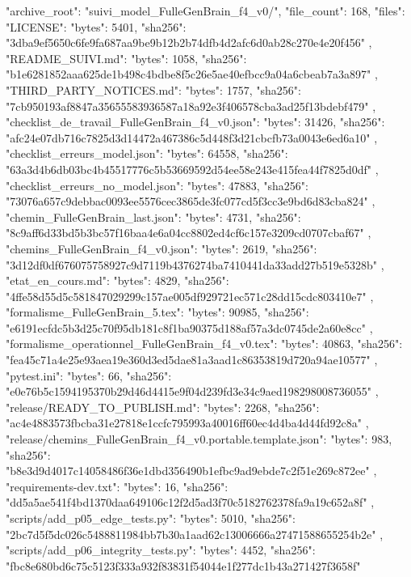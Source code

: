 {
  "archive_root": "suivi_model_FulleGenBrain_f4_v0/",
  "file_count": 168,
  "files": {
    "LICENSE": {
      "bytes": 5401,
      "sha256": "3dba9ef5650c6fe9fa687aa9be9b12b2b74dfb4d2afc6d0ab28c270e4e20f456"
    },
    "README_SUIVI.md": {
      "bytes": 1058,
      "sha256": "b1e6281852aaa625de1b498c4bdbe8f5c26e5ae40efbcc9a04a6cbeab7a3a897"
    },
    "THIRD_PARTY_NOTICES.md": {
      "bytes": 1757,
      "sha256": "7cb950193af8847a35655583936587a18a92e3f406578cba3ad25f13bdebf479"
    },
    "checklist_de_travail_FulleGenBrain_f4_v0.json": {
      "bytes": 31426,
      "sha256": "afc24e07db716c7825d3d14472a467386c5d448f3d21cbcfb73a0043e6ed6a10"
    },
    "checklist_erreurs_model.json": {
      "bytes": 64558,
      "sha256": "63a3d4b6db03bc4b45517776c5b53669592d54ee58e243e415fea44f7825d0df"
    },
    "checklist_erreurs_no_model.json": {
      "bytes": 47883,
      "sha256": "73076a657c9debbac0093ee5576cec3865de3fc077cd5f3cc3e9bd6d83cba824"
    },
    "chemin_FulleGenBrain_last.json": {
      "bytes": 4731,
      "sha256": "8c9aff6d33bd5b3bc57f16baa4e6a04cc8802ed4cf6c157e3209cd0707cbaf67"
    },
    "chemins_FulleGenBrain_f4_v0.json": {
      "bytes": 2619,
      "sha256": "3d12df0df676075758927c9d7119b4376274ba7410441da33add27b519e5328b"
    },
    "etat_en_cours.md": {
      "bytes": 4829,
      "sha256": "4ffe58d55d5c581847029299c157ae005df929721ec571c28dd15cdc803410e7"
    },
    "formalisme_FulleGenBrain_5.tex": {
      "bytes": 90985,
      "sha256": "e6191ecfdc5b3d25c70f95db181c8f1ba90375d188af57a3dc0745de2a60e8cc"
    },
    "formalisme_operationnel_FulleGenBrain_f4_v0.tex": {
      "bytes": 40863,
      "sha256": "fea45c71a4e25e93aea19e360d3ed5dae81a3aad1c86353819d720a94ae10577"
    },
    "pytest.ini": {
      "bytes": 66,
      "sha256": "e0e76b5c1594195370b29d46d4415e9f04d239fd3e34c9aed198298008736055"
    },
    "release/READY_TO_PUBLISH.md": {
      "bytes": 2268,
      "sha256": "ac4e4883573fbcba31e27818e1ccfc795993a40016ff60ec4d4ba4d44fd92c8a"
    },
    "release/chemins_FulleGenBrain_f4_v0.portable.template.json": {
      "bytes": 983,
      "sha256": "b8e3d9d4017c14058486f36e1dbd356490b1efbc9ad9ebde7c2f51e269c872ee"
    },
    "requirements-dev.txt": {
      "bytes": 16,
      "sha256": "dd5a5ae541f4bd1370daa649106c12f2d5ad3f70c5182762378fa9a19c652a8f"
    },
    "scripts/add_p05_edge_tests.py": {
      "bytes": 5010,
      "sha256": "2bc7d5f5dc026c5488811984bb7b30a1aad62c13006666a27471588655254b2e"
    },
    "scripts/add_p06_integrity_tests.py": {
      "bytes": 4452,
      "sha256": "fbc8e680bd6c75c5123f333a932f83831f54044e1f277dc1b43a271427f3658f"
}}}

